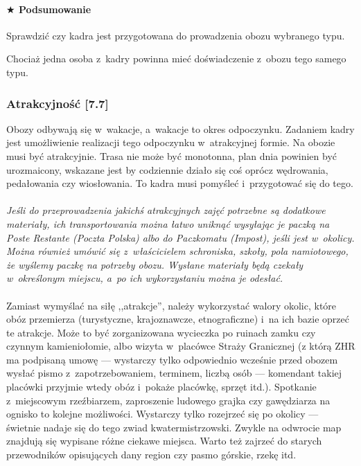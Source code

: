 \documentclass[a5paper,10pt,titlepage,twoside]{article}
\newcommand*{\thecheckbox}{\hss$\Box$} %
\newenvironment*{checklist}
{\list{}{%
\renewcommand*{\makelabel}[1]{\thecheckbox}}}
{\endlist}
\begin{document}
\paragraph{$\bigstar$ Podsumowanie}
\begin{checklist}
\item Sprawdzić czy kadra jest przygotowana do prowadzenia obozu wybranego typu.
\item Chociaż jedna osoba z~kadry powinna mieć doświadczenie z~obozu tego samego typu.
\end{checklist}

\subsubsection{Atrakcyjność [7.7] \label{atrakcyjnosc}}
Obozy odbywają się w~wakacje, a~wakacje to okres odpoczynku. Zadaniem kadry jest umożliwienie realizacji tego odpoczynku w~atrakcyjnej formie. Na obozie musi być atrakcyjnie. Trasa nie może być monotonna, plan dnia powinien być urozmaicony, wskazane jest by codziennie działo się coś oprócz wędrowania, pedałowania czy wiosłowania. To kadra musi pomyśleć i~przygotować się do tego.
\\
\\
\small{
\emph{Jeśli do przeprowadzenia jakichś atrakcyjnych zajęć potrzebne są dodatkowe materiały, ich transportowania można łatwo uniknąć wysyłając je paczką na Poste Restante (Poczta Polska) albo do Paczkomatu (Impost), jeśli jest w~okolicy. Można również umówić się z~właścicielem schroniska, szkoły, pola namiotowego, że wyślemy paczkę na potrzeby obozu. Wysłane materiały będą czekały w~określonym miejscu, a~po ich wykorzystaniu można je odesłać.}}
\\
\\
Zamiast wymyślać na siłę ,,atrakcje'', należy wykorzystać walory okolic, które obóz przemierza (turystyczne, krajoznawcze, etnograficzne) i~na ich bazie oprzeć te atrakcje. Może to być zorganizowana wycieczka po ruinach zamku czy czynnym kamieniołomie, albo wizyta w~placówce Straży Granicznej (z którą ZHR ma podpisaną umowę --- wystarczy tylko odpowiednio wcześnie przed obozem wysłać pismo z~zapotrzebowaniem, terminem, liczbą osób --- komendant takiej placówki przyjmie wtedy obóz i~pokaże placówkę, sprzęt itd.). Spotkanie z~miejscowym rzeźbiarzem, zaproszenie ludowego grajka czy gawędziarza na ognisko to kolejne możliwości. Wystarczy tylko rozejrzeć się po okolicy --- świetnie nadaje się do tego zwiad kwatermistrzowski. Zwykle na odwrocie map znajdują się wypisane różne ciekawe miejsca. Warto też zajrzeć do starych przewodników opisujących dany region czy pasmo górskie, rzekę itd.
\end{document}
